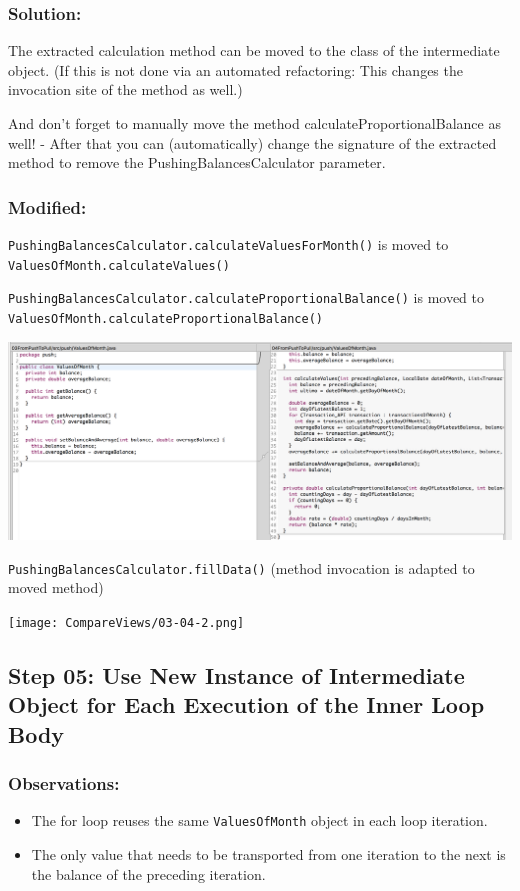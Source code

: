 \documentclass[a4paper,fleqn,titlepage,11pt]{article}
\begin{document}
\subsubsection*{Solution:}

The extracted calculation method can be moved to the class of the intermediate object. (If this is not done via an automated refactoring: This changes the invocation site of the method as well.)

And don't forget to manually move the method calculateProportionalBalance as well! - After that you can (automatically) change the signature of the extracted method to remove the PushingBalancesCalculator parameter.

\subsubsection*{Modified:}

\texttt{PushingBalancesCalculator.calculateValuesForMonth()} is moved to\\ \texttt{ValuesOfMonth.calculateValues()}

\texttt{PushingBalancesCalculator.calculateProportionalBalance()} is moved to\\ \texttt{ValuesOfMonth.calculateProportionalBalance()}

\includegraphics[width=1\textwidth]{CompareViews/03-04-1.png}

\texttt{PushingBalancesCalculator.fillData()} (method invocation is adapted to moved method)

\texttt{[image: CompareViews/03-04-2.png]}


\subsection*{Step 05: Use New Instance of Intermediate Object for Each Execution of the Inner Loop Body}

\subsubsection*{Observations:}
\begin{itemize}
\item The for loop reuses the same \texttt{ValuesOfMonth} object in each loop iteration.
\item The only value that needs to be transported from one iteration to the next is the balance of the preceding iteration.
\end{itemize}
\end{document}
